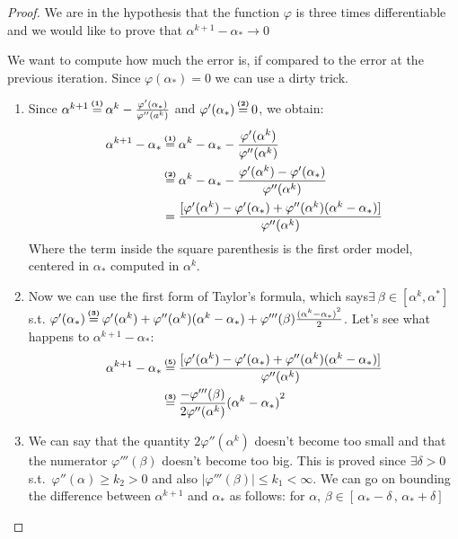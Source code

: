 \documentclass[ComputationalMathematics.tex]{subfiles}
\begin{document}
\begin{proof}
  We are in the hypothesis that the function $\varphi$ is three times differentiable and we would like to prove that $\alpha^{k+1} - \alpha_* \rightarrow 0$

We want to compute how much the error is, if compared to the error at the previous iteration.
  Since $\varphi(\alpha_{*}) = 0$ we can use a dirty trick. 
  \begin{enumerate}
    \item Since $\alpha^{k+1} \numeq{(1)} \alpha^k - \frac{\varphi'({\alpha}_*)}{\varphi''(a^k)}$ and $\varphi'(\alpha_*) \numeq{(2)} 0$, we obtain:
  \begin{equation}
    \begin{split}
      \alpha^{k+1} - \alpha_* & \numeq{(1)} \alpha^k - \alpha_* - \frac{\varphi'(\alpha^k)}{\varphi''(\alpha^k)}\\
      & \numeq{(2)} \alpha^k - \alpha_* - \frac{\varphi'(\alpha^k) - \varphi'(\alpha_*)}{\varphi''(\alpha^k)}\\
      & = \frac{[\varphi'(\alpha^k) -\varphi'(\alpha_*) + \varphi''(\alpha^k) (\alpha^k - \alpha_*)]}{\varphi''(\alpha^k)} 
    \end{split}
  \end{equation}
 Where the term inside the square parenthesis  is the first order model, centered in $\alpha_*$ computed in $\alpha^k$.
  \item Now we can use the first form of Taylor's formula, which says$\exists ~ \beta \in [\alpha^k, \alpha^*]$ s.t. $\varphi'(\alpha_{*}) \numeq{(3)} \varphi'(\alpha^{k}) + \varphi''(\alpha^{k}) (\alpha^{k} - \alpha_{*}) + \varphi'''(\beta) \frac{{(\alpha^{k} - \alpha_{*})}^{2}}{2}$.
    Let's see what happens to $\alpha^{k+1} - \alpha_*$:
  \begin{equation}
    \begin{split}
      \alpha^{k+1} - \alpha_* & \numeq{(5)} \frac{[\varphi'(\alpha^k) -\varphi'(\alpha_*) + \varphi''(\alpha^k) (\alpha^k - \alpha_*)]}{\varphi''(\alpha^k)}\\
      & \numeq{(3)} \frac{-\varphi'''(\beta)}{2 \varphi''(\alpha^k)} {(\alpha^k - \alpha_*)}^2
    \end{split}
  \end{equation}
\item We can say that the quantity $2\varphi''(\alpha^{k})$ doesn't become too small and that the numerator $\varphi'''(\beta)$ doesn't become too big. This is proved since $\exists \delta > 0$ s.t.~$\varphi''(\alpha) \geq k_2 > 0$ and also  $| \varphi'''(\beta) | \leq k_1 < \infty$. We can go on bounding the difference between $\alpha^{k+1}$ and $\alpha_*$ as follows: for $\alpha$, $\beta \in [ \, \alpha_* - \delta \,,\, \alpha_* + \delta ]\, $
       

\end{enumerate}
\end{proof}
\end{document}
